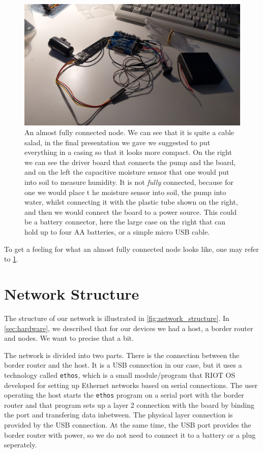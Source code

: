 \documentclass[acmtog, language=english, nonacm]{acmart}
\begin{document}
    \begin{figure}[!hbtp]
        \centering
        \includegraphics[angle=180, width=\linewidth]{img/almost_fully_connected_node.jpg}
        \caption{An almost fully connected node. We can see that it is quite a cable salad, in the final presentation we gave we suggested to put everything in a casing so that it looks more compact. On the right we can see the driver board that connects the pump and the board, and on the left the capacitive moisture sensor that one would put into soil to measure humidity. It is not \emph{fully} connected, because for one we would place t he moisture sensor into soil, the pump into water, whilst connecting it with the plastic tube shown on the right, and then we would connect the board to a power source. This could be a battery connector, here the large case on the right that can hold up to four AA batteries, or a simple micro USB cable.}
        \label{fig:almost_fully_connected_node}
    \end{figure}

    To get a feeling for what an almost fully connected node looks like, one may refer to \cref{fig:almost_fully_connected_node}.

    \label{sec:network_structure} \section{Network Structure}

    The structure of our network is illustrated in \cref{fig:network_structure}. In \cref{sec:hardware}, we described that for our devices we had a host, a border router and nodes. We want to precise that a bit.

    The network is divided into two parts. There is the connection between the border router and the host. It is a USB connection in our case, but it uses a technology called \texttt{ethos}, which is a small module/program that RIOT OS developed for setting up Ethernet networks based on serial connections. The user operating the host starts the \texttt{ethos} program on a serial port with the border router and that program sets up a layer 2 connection with the board by binding the port and transfering data inbetween. The physical layer connection is provided by the USB connection. At the same time, the USB port provides the border router with power, so we do not need to connect it to a battery or a plug seperately.
\end{document}
